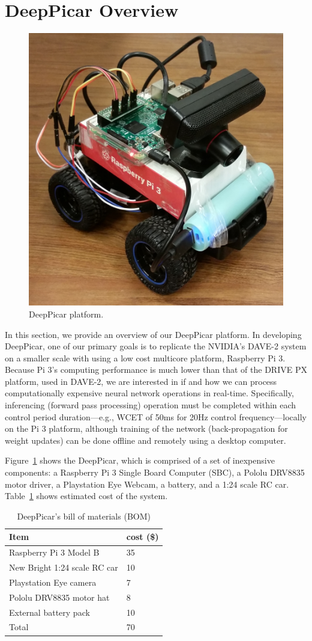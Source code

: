 \section{DeepPicar Overview}

\begin{figure}[h]
  \centering
  \includegraphics[width=.4\textwidth]{figs/DeepPicar_platform}
  \caption{DeepPicar platform.}
  \label{fig:overview}
\end{figure}

In this section, we provide an overview of our DeepPicar platform. In
developing DeepPicar, one of our primary goals is to replicate the
NVIDIA's DAVE-2 system on a smaller scale with using a low cost
multicore platform, Raspberry Pi 3. Because Pi 3's computing
performance is much lower than that of the DRIVE PX platform, used in
DAVE-2, we are interested in if and how we can process
computationally expensive neural network operations in
real-time. Specifically, inferencing (forward pass processing)
operation must be completed within each control period
duration---e.g., WCET of 50ms for 20Hz control frequency---locally on
the Pi 3 platform, although training of the network (back-propagation
for weight updates) can be done offline and remotely using a desktop
computer.

Figure~\ref{fig:overview} shows the DeepPicar, which is comprised of a
set of inexpensive components: a Raspberry Pi 3 Single Board Computer
(SBC), a Pololu DRV8835 motor driver, a Playstation Eye Webcam, a
battery, and a 1:24 scale RC car. Table~\ref{tbl:carbom} shows
estimated cost of the system.

\begin{table}[h]
  \centering
  \begin{tabular}{|l|l|}
    \hline
    Item                    & cost (\$) \\
    \hline
    Raspberry Pi 3 Model B  & 35 \\
    New Bright 1:24 scale RC car       & 10 \\
    Playstation Eye camera  &  7 \\
    Pololu DRV8835 motor hat&  8 \\
    External battery pack   & 10 \\
    \hline
    Total                   & 70 \\
    \hline
  \end{tabular}
  \caption{DeepPicar's bill of materials (BOM)}
  \label{tbl:carbom}
\end{table}

